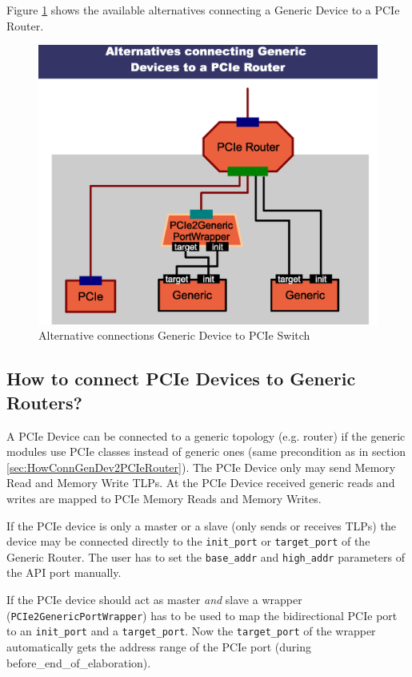 Figure \ref{fig:ConnGenDev2PCIeSwitch} shows the available alternatives connecting a Generic Device to a PCIe Router.

\begin{figure}[H]%
	\centerline{
		\includegraphics[width=13cm]{figures/Conn_GenericDev_PCIeRouter.eps} 
	}
	\caption{Alternative connections Generic Device to PCIe Switch}
	\label{fig:ConnGenDev2PCIeSwitch}
\end{figure}

\subsection{How to connect PCIe Devices to Generic Routers?}
\label{sec:HowConnPCIe2GenRouters}

A PCIe Device can be connected to a generic topology (e.g. router) if the generic modules use PCIe classes instead of generic ones (same precondition as in section \ref{sec:HowConnGenDev2PCIeRouter}). The PCIe Device only may send Memory Read and Memory Write TLPs. At the PCIe Device received generic reads and writes are mapped to PCIe Memory Reads and Memory Writes.

If the PCIe device is only a master or a slave (only sends or receives TLPs) the device may be connected directly to the \lstinline|init_port| or \lstinline|target_port| of the Generic Router. The user has to set the \lstinline|base_addr| and \lstinline|high_addr| parameters of the API port manually.

If the PCIe device should act as master \emph{and} slave a wrapper (\lstinline|PCIe2GenericPortWrapper|) has to be used to map the bidirectional PCIe port to an \lstinline|init_port| and a \lstinline|target_port|. Now the \lstinline|target_port| of the wrapper automatically gets the address range of the PCIe port (during before\_end\_of\_elaboration).

